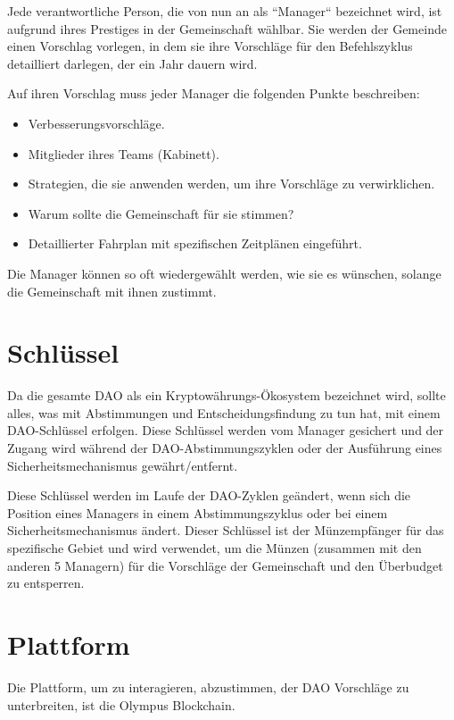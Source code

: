 \documentclass{article}
\begin{document}
Jede verantwortliche Person, die von nun an als ``Manager`` bezeichnet wird, ist aufgrund ihres Prestiges in der Gemeinschaft wählbar. Sie werden der Gemeinde einen Vorschlag vorlegen, in dem sie ihre Vorschläge für den Befehlszyklus detailliert darlegen, der ein Jahr dauern wird.

Auf ihren Vorschlag muss jeder Manager die folgenden Punkte beschreiben:

\begin{itemize}
  \item Verbesserungsvorschläge.
  \item Mitglieder ihres Teams (Kabinett).
  \item Strategien, die sie anwenden werden, um ihre Vorschläge zu verwirklichen.
  \item Warum sollte die Gemeinschaft für sie stimmen?
  \item Detaillierter Fahrplan mit spezifischen Zeitplänen eingeführt.
\end{itemize}

Die Manager können so oft wiedergewählt werden, wie sie es wünschen, solange die Gemeinschaft mit ihnen zustimmt.

\section{Schlüssel}

Da die gesamte DAO als ein Kryptowährungs-Ökosystem bezeichnet wird, sollte alles, was mit Abstimmungen und Entscheidungsfindung zu tun hat, mit einem DAO-Schlüssel erfolgen. Diese Schlüssel werden vom Manager gesichert und der Zugang wird während der DAO-Abstimmungszyklen oder der Ausführung eines Sicherheitsmechanismus gewährt/entfernt.

Diese Schlüssel werden im Laufe der DAO-Zyklen geändert, wenn sich die Position eines Managers in einem Abstimmungszyklus oder bei einem Sicherheitsmechanismus ändert. Dieser Schlüssel ist der Münzempfänger für das spezifische Gebiet und wird verwendet, um die Münzen (zusammen mit den anderen 5 Managern) für die Vorschläge der Gemeinschaft und den Überbudget zu entsperren.

\section{Plattform}

Die Plattform, um zu interagieren, abzustimmen, der DAO Vorschläge zu unterbreiten, ist die Olympus Blockchain.
\end{document}
